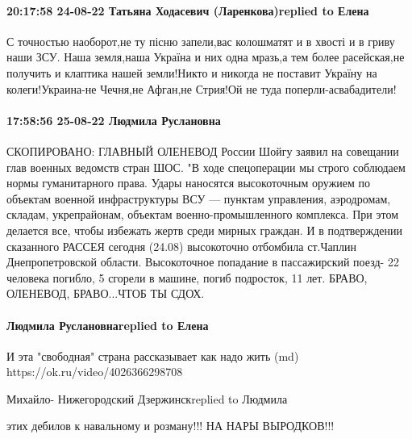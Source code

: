 \paragraph{20:17:58 24-08-22 Татьяна Ходасевич (Ларенкова)replied to Елена}

С точностью наоборот,не ту пісню запели,вас колошматят и в хвості и в гриву
наши ЗСУ. Наша земля,наша Україна и них одна мразь,а тем более расейская,не
получить и клаптика нашей земли!Никто и никогда не поставит Україну на
колеги!Украина-не Чечня,не Афган,не Стрия!Ой не туда поперли-асвабадители!

\paragraph{17:58:56 25-08-22 Людмила Руслановна}

СКОПИРОВАНО: ГЛАВНЫЙ ОЛЕНЕВОД России Шойгу заявил на совещании глав военных
ведомств стран ШОС. "В ходе спецоперации мы строго соблюдаем нормы
гуманитарного права. Удары наносятся высокоточным оружием по объектам военной
инфраструктуры ВСУ — пунктам управления, аэродромам, складам, укрепрайонам,
объектам военно-промышленного комплекса. При этом делается все, чтобы избежать
жертв среди мирных граждан. И в подтверждении сказанного РАССЕЯ сегодня (24.08)
высокоточно отбомбила ст.Чаплин Днепропетровской области. Высокоточное
попадание в пассажирский поезд- 22 человека погибло, 5 сгорели в машине, погиб
подросток, 11 лет. БРАВО, ОЛЕНЕВОД, БРАВО...ЧТОБ ТЫ СДОХ.

\paragraph{Людмила Руслановнаreplied to Елена}

И эта "свободная" страна рассказывает как надо жить (md)
https://ok.ru/video/4026366298708

Михайло- Нижегородский Дзержинскreplied to Людмила

этих дебилов к навальному и розману!!! НА НАРЫ ВЫРОДКОВ!!!
